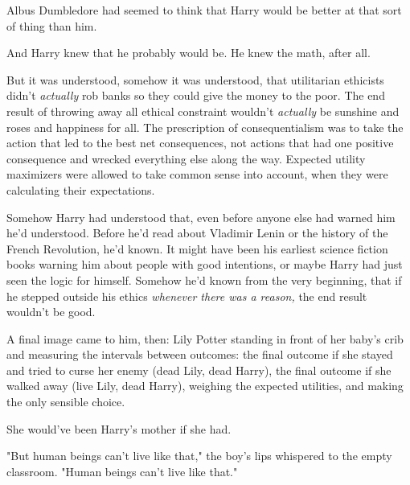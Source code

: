Albus Dumbledore had seemed to think that Harry would be better at that sort of
thing than him.

And Harry knew that he probably would be. He knew the math, after all.

But it was understood, somehow it was understood, that utilitarian ethicists
didn't \emph{actually} rob banks so they could give the money to the poor. The
end result of throwing away all ethical constraint wouldn't \emph{actually} be
sunshine and roses and happiness for all. The prescription of consequentialism
was to take the action that led to the best net consequences, not actions that
had one positive consequence and wrecked everything else along the way.
Expected utility maximizers were allowed to take common sense into account,
when they were calculating their expectations.

Somehow Harry had understood that, even before anyone else had warned him he'd
understood. Before he'd read about Vladimir Lenin or the history of the French
Revolution, he'd known. It might have been his earliest science fiction books
warning him about people with good intentions, or maybe Harry had just seen the
logic for himself. Somehow he'd known from the very beginning, that if he
stepped outside his ethics \emph{whenever there was a reason,} the end result
wouldn't be good.

A final image came to him, then: Lily Potter standing in front of her baby's
crib and measuring the intervals between outcomes: the final outcome if she
stayed and tried to curse her enemy (dead Lily, dead Harry), the final outcome
if she walked away (live Lily, dead Harry), weighing the expected utilities,
and making the only sensible choice.

She would've been Harry's mother if she had.

"But human beings can't live like that," the boy's lips whispered to the empty
classroom. "Human beings can't live like that."
